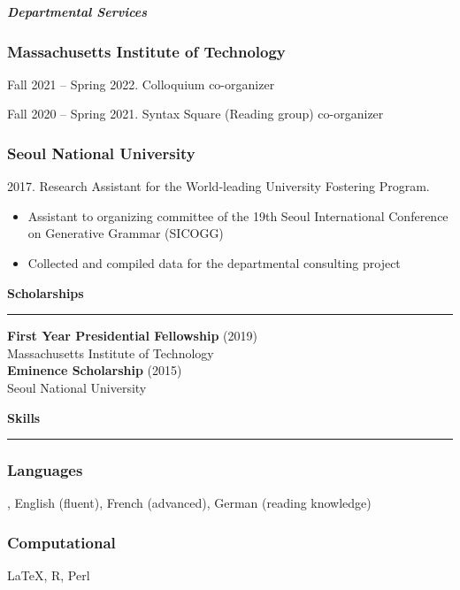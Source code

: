\documentclass[11pt]{article}
\newcommand{\sect}[1]{{\fontsize{15}{25}\selectfont \textbf{#1}} {\vspace{0.1cm}} \hrule {\vspace{0.3cm}}}
\newcommand{\subsect}[1]{{\fontsize{12}{18}\selectfont \textit{\textbf{#1}}} {\vspace{0.3cm}}}
\begin{document}
\subsect{Departmental Services}

\vspace{-0.75cm}

\subsubsection*{Massachusetts Institute of Technology}
Fall 2021 -- Spring 2022. Colloquium co-organizer

Fall 2020 -- Spring 2021. Syntax Square (Reading group) co-organizer

\subsubsection*{Seoul National University}
{2017. Research Assistant for the World-leading University Fostering Program.

\begin{itemize}[leftmargin=15pt, topsep=0pt, itemsep=0pt, parsep=0pt]
	\item{{\small Assistant to organizing committee of the 19th Seoul International Conference on Generative Grammar (SICOGG)}}
	\item{{\small Collected and compiled data for the departmental consulting project}}
\end{itemize}
}

\vspace{1cm}

\sect{Scholarships}

\textbf{First Year Presidential Fellowship} (2019)\\{Massachusetts Institute of Technology}\\

{\textbf{Eminence Scholarship}} (2015)\\{Seoul National University}\\

\vspace{1cm}

\sect{Skills}

\subsubsection*{Languages}
, English (fluent), French (advanced), German (reading knowledge)
\subsubsection*{Computational}
 {\LaTeX}, R, Perl
\end{document}
